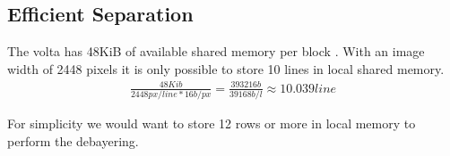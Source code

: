 \begin{table}[H]
\begin{minipage}[b]{.5\linewidth}
    \end{minipage}
    \caption{Comparison of the number of \gls{fma} operations required to get the desired output. On the left }
\end{table}



\subsection{Efficient Separation}
The \gls{volta} has 48KiB of available shared memory per block \cite{rigerunNVIDIAJetsonXavier2023}.
With an image width of 2448 pixels \cite{lucidvisionlabsTriton0MPPolarization} it is only possible to store 10 lines in local shared memory.
\begin{align}
    \frac{48Kib}{2448px/line * 16b/px} = \frac{393216b}{39168b/l} \approx 10.039line
\end{align}

For simplicity we would want to store 12 rows or more in local memory to perform the debayering.


